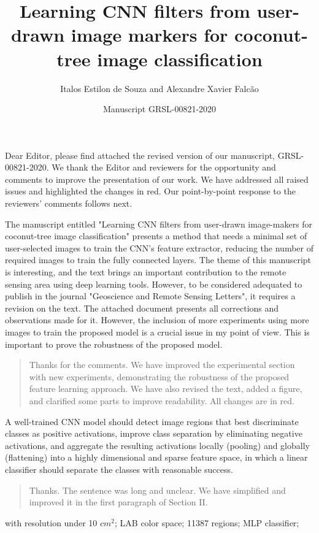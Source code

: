 \documentclass[a4paper,12pt]{article}
\title{Learning CNN filters from user-drawn image markers for coconut-tree image classification}
\author{Italos Estilon de Souza and Alexandre Xavier Falc\~{a}o}
\date{Manuscript GRSL-00821-2020}
\newcommand{\rwr}[1]{\par \medskip \noindent {\bf Reviewer #1: }}
\newcommand{\ans}{\smallskip\begin{quote}  \noindent }
\newcommand{\eans}{\end{quote}}
\begin{document}
\maketitle

Dear Editor, please find attached the revised version of our manuscript, GRSL-00821-2020. We thank the Editor and
reviewers for the opportunity and comments to improve the presentation of our work. We have addressed all raised issues and highlighted the changes in red. Our point-by-point response to the reviewers' comments follows next. 

\rwr{1} 
The manuscript entitled "Learning CNN ﬁlters from user-drawn image-makers for coconut-tree image classiﬁcation" presents a method that needs a minimal set of user-selected images to train the CNN’s feature extractor, reducing the number of required images to train the fully connected layers. The theme of this manuscript is interesting, and the text brings an important contribution to the remote sensing area using deep learning tools. However, to be considered adequated to publish in the journal "Geoscience and Remote Sensing Letters", it requires a revision on the text. The attached document presents all corrections and observations made for it. However, the inclusion of more experiments using more images to train the proposed model is a crucial issue in my point of view. This is important to prove the robustness of the proposed model.

\ans 

Thanks for the comments. We have improved the experimental section with new experiments, demonstrating the robustness of the proposed feature learning approach. We have also revised the text, added a figure, and clarified some parts to improve readability. All changes are in red. 

\eans


\rwr{1} A well-trained CNN model should detect image regions that best discriminate classes as positive activations, improve class separation by eliminating negative activations, and aggregate the resulting activations locally (pooling) and globally (flattening) into a highly dimensional and sparse feature space, in which a linear classifier should separate the classes with reasonable success.

\ans  Thanks. The sentence was long and unclear. We have simplified and improved it in the first paragraph of Section II.
\eans

\rwr{1} with resolution under 10 $cm^2$; LAB color space; 11387 regions; MLP classifier; 
\end{document}

